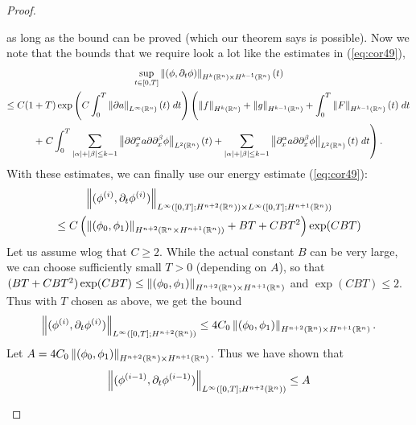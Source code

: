 \documentclass{article}
\begin{document}
\begin{proof}
\begin{enumerate}[itemsep =-2pt,label = (\arabic{*})]
\begin{enumerate}
\begin{equation*}
			\end{equation*}
			as long as the bound can be proved (which our theorem says is possible). Now we note that the bounds that we require look a lot like the estimates in (\ref{eq:cor49}), 
			\begin{multline*}
				\sup_{t\in[0,T]}\left\Vert (\phi, \partial_{t}\phi) \right\Vert_{H^{k}(\mathbb{R}^{n}) \times H^{k -1}(\mathbb{R}^{n})}(t) \\ \leq C(1 + T)\exp\left(C\int_{0}^{T}\left\Vert \partial a \right\Vert_{L^{\infty}(\mathbb{R}^{n})}(t)\;dt\right)\left(\left\Vert f \right\Vert_{H^{k}(\mathbb{R}^{n})} 
				+ \left\Vert g \right\Vert_{H^{k - 1}(\mathbb{R}^{n})} + \int_{0}^{T}\left\Vert F \right\Vert_{H^{k - 1}(\mathbb{R}^{n})}(t)\;dt\right.\\ + \left. C\int_{0}^{T}\sum_{|\alpha| + |\beta| \leq k - 1}\left\Vert \partial\partial_{x}^{\alpha}a\partial\partial_{x}^{\beta}\phi \right\Vert_{L^{2}(\mathbb{R}^{n})}(t) + \sum_{|\alpha| + |\beta| \leq k- 1}\left\Vert \partial_{x}^{\alpha}a\partial\partial_{x}^{\beta}\phi \right\Vert_{L^{2}(\mathbb{R}^{n})}(t)\;dt\right). 
			\end{multline*}
			With these estimates, we can finally use our energy estimate (\ref{eq:cor49}): 
			\begin{multline*}
				\left\Vert (\phi^{(i)}, \partial_{t}\phi^{(i)}) \right\Vert_{L^{\infty}([0,T];H^{n + 2}(\mathbb{R}^{n})) \times L^{\infty}([0,T];H^{n + 1}(\mathbb{R}^{n}))} \\
				\leq C\left(\left\Vert (\phi_{0}, \phi_{1}) \right\Vert_{H^{n + 2}(\mathbb{R}^{n} \times H^{n + 1}(\mathbb{R}^{n}))} + BT + CBT^{2}\right)\exp(CBT)
			\end{multline*} 
			Let us assume wlog that $C \geq 2$. While the actual constant $B$ can be very large, we can choose sufficiently small $T > 0$ (depending on $A$), so that $(BT + CBT^{2})\exp(CBT) \leq \left\Vert (\phi_{0}, \phi_{1}) \right\Vert_{H^{n + 2}(\mathbb{R}^{n}) \times H^{n+ 1}(\mathbb{R}^{n})}$ and $\exp(CBT) \leq 2$. Thus with $T$ chosen as above, we get the bound 
			\begin{equation*}
				\left\Vert (\phi^{(i)}, \partial_{t}\phi^{(i)}) \right\Vert_{L^{\infty}([0,T]; H^{n + 2}(\mathbb{R}^{n}))} \leq 4C_{0}\left\Vert (\phi_{0}, \phi_{1}) \right\Vert_{H^{n + 2}(\mathbb{R}^{n}) \times H^{n + 1}(\mathbb{R}^{n})}. 
			\end{equation*} 
			Let $A = 4C_{0}\left\Vert (\phi_{0}, \phi_{1}) \right\Vert_{H^{n + 2}(\mathbb{R}^{n}) \times H^{n + 1}(\mathbb{R}^{n})}$. Thus we have shown that 
			\begin{equation*}
				\left\Vert (\phi^{(i-1)}, \partial_{t}\phi^{(i-1)}) \right\Vert_{L^{\infty}([0,T]; H^{n + 2}(\mathbb{R}^{n}))} \leq A
			\end{equation*} 

\end{enumerate}
\end{enumerate}
\end{proof}
\end{document}
